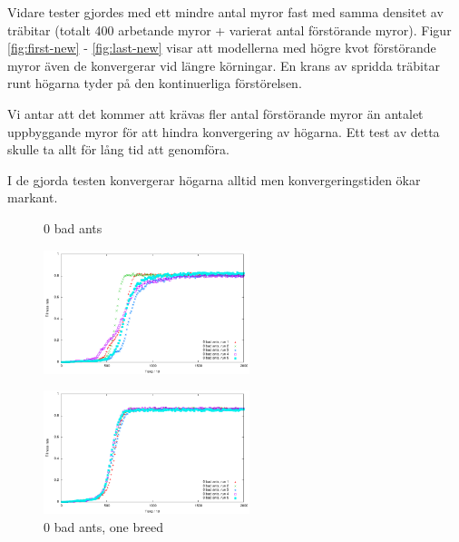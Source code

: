 \documentclass[titlepage, a4paper, 12pt]{article}
\begin{document}
Vidare tester gjordes med ett mindre antal myror fast med samma
densitet av träbitar (totalt 400 arbetande myror + varierat antal
förstörande myror). Figur \ref{fig:first-new} - \ref{fig:last-new}
visar att modellerna med högre kvot förstörande myror även de
konvergerar vid längre körningar. En krans av spridda träbitar runt
högarna tyder på den kontinuerliga förstörelsen.

Vi antar att det kommer att krävas fler antal förstörande myror än
antalet uppbyggande myror för att hindra konvergering av högarna. Ett
test av detta skulle ta allt för lång tid att genomföra.

I de gjorda testen konvergerar högarna alltid men konvergeringstiden
ökar markant.


\begin{figure}
  \begin{minipage}[b]{0.5\linewidth}
    \centering
    \caption{0  bad ants }\label{fig:images/graph0}
    \includegraphics[width=6cm]{images/graph0.pdf}
  \end{minipage}
  \begin{minipage}[b]{0.5\linewidth}
    \centering
    \caption{0 bad ants, one breed }\label{fig:images/graph0oneBreed}
    \includegraphics[width=6cm]{images/graph0oneBreed.pdf}
  \end{minipage}
  
  \hspace{0.5cm}
  

\end{figure}
\end{document}
